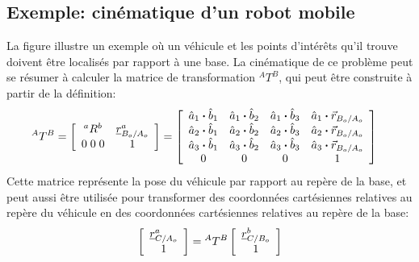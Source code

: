 \newpage
\subsection{Exemple: cinématique d'un robot mobile}

La figure illustre un exemple où un véhicule et les points d’intérêts qu'il trouve doivent être localisés par rapport à une base. La cinématique de ce problème peut se résumer à calculer la matrice de transformation $^AT^B$, qui peut être construite à partir de la définition:
\begin{align}
{}^AT^B &=
\left[ \begin{array}{c c }
		   ^aR^b & \underline{r}_{B_o/A_o}^a \\ 0 \; 0 \; 0 & 1
\end{array} \right]
=
\left[ \begin{array}{c c c c}
		   \hat{a}_1 \boldsymbol{\cdot} \hat{b}_1  &  \hat{a}_1 \boldsymbol{\cdot} \hat{b}_2  &  \hat{a}_1 \boldsymbol{\cdot} \hat{b}_3 & \hat{a}_1 \boldsymbol{\cdot} \vec{r}_{B_o/A_o} \\
		   \hat{a}_2 \boldsymbol{\cdot} \hat{b}_1  &  \hat{a}_2 \boldsymbol{\cdot} \hat{b}_2  &  \hat{a}_2 \boldsymbol{\cdot} \hat{b}_3 & \hat{a}_2 \boldsymbol{\cdot} \vec{r}_{B_o/A_o}\\
		   \hat{a}_3 \boldsymbol{\cdot} \hat{b}_1  &  \hat{a}_3 \boldsymbol{\cdot} \hat{b}_2  &  \hat{a}_3 \boldsymbol{\cdot} \hat{b}_3 & \hat{a}_3 \boldsymbol{\cdot} \vec{r}_{B_o/A_o} \\
		   0 & 0 & 0 & 1
\end{array} \right]
\label{eq:transformationdef_app}
\end{align}
Cette matrice représente la pose du véhicule par rapport au repère de la base, et peut aussi être utilisée pour transformer des coordonnées cartésiennes relatives au repère du véhicule en des coordonnées cartésiennes relatives au repère de la base:
\begin{align}
	\left[ \begin{array}{c}
			   \underline{r}_{C/A_o}^a \\ 1
	\end{array} \right]
	=
	{}^AT^B
	\left[ \begin{array}{c}
			   \underline{r}_{C/B_o}^b \\ 1
	\end{array} \right]
	\label{eq:homo1_app}
\end{align}

